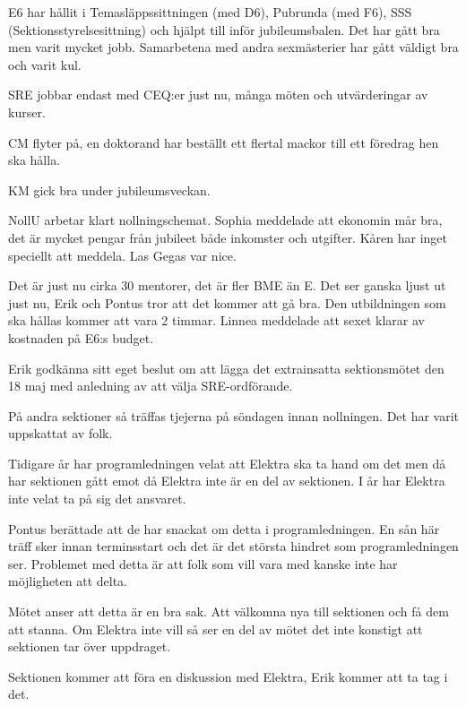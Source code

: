 \documentclass[10pt]{article}
\begin{document}
\begin{paragrafer}
\begin{paragrafer}
E6 har hållit i Temasläppssittningen (med D6), Pubrunda (med F6), SSS (Sektionsstyrelsesittning) och hjälpt till inför jubileumsbalen. Det har gått bra men varit mycket jobb. Samarbetena med andra sexmästerier har gått väldigt bra och varit kul.

SRE jobbar endast med CEQ:er just nu, många möten och utvärderingar av kurser.

CM flyter på, en doktorand har beställt ett flertal mackor till ett föredrag hen ska hålla.

KM gick bra under jubileumsveckan.

NollU arbetar klart nollningschemat.
Sophia meddelade att ekonomin mår bra, det är mycket pengar från jubileet både inkomster och utgifter.
Kåren har inget speciellt att meddela. Las Gegas var nice.
\end{paragrafer}
\newpage
{}
Det är just nu cirka 30 mentorer, det är fler BME än E. Det ser ganska ljust ut just nu, Erik och Pontus tror att det kommer att gå bra. Den utbildningen som ska hållas kommer att vara 2 timmar.
Linnea meddelade att sexet klarar av kostnaden på E6:s budget.

Erik \ypa godkänna sitt eget beslut om att lägga det extrainsatta sektionsmötet den 18 maj med anledning av att välja SRE-ordförande.

\Mbaby

På andra sektioner så träffas tjejerna på söndagen innan nollningen. Det har varit uppskattat av folk.

Tidigare år har programledningen velat att Elektra ska ta hand om det men då har sektionen gått emot då Elektra inte är en del av sektionen. I år har Elektra inte velat ta på sig det ansvaret.

Pontus berättade att de har snackat om detta i programledningen. En sån här träff sker innan terminsstart och det är det största hindret som programledningen ser. Problemet med detta är att folk som vill vara med kanske inte har möjligheten att delta.

Mötet anser att detta är en bra sak. Att välkomna nya till sektionen och få dem att stanna. Om Elektra inte vill så ser en del av mötet det inte konstigt att sektionen tar över uppdraget.

Sektionen kommer att föra en diskussion med Elektra, Erik kommer att ta tag i det.


\end{paragrafer}
\end{document}
